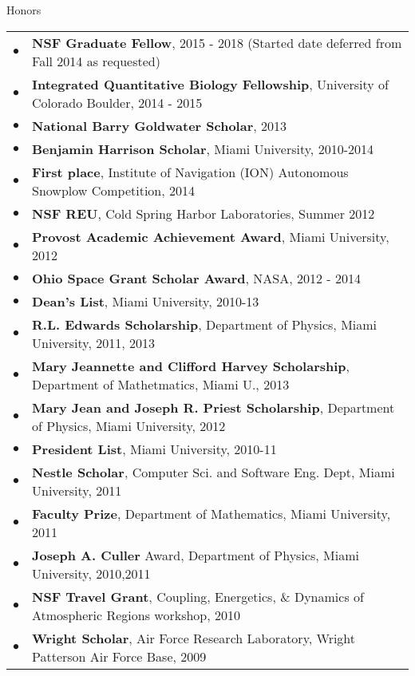 \documentclass{resume} %
\begin{document}
\begin{rSection}{Honors}
  \begin{tabular}{ll}
    $\bullet$ & \textbf{NSF Graduate Fellow}, 2015 - 2018 (Started date deferred from Fall 2014 as requested)\\
    $\bullet$ & \textbf{Integrated Quantitative Biology Fellowship}, University of Colorado Boulder, 2014 - 2015\\
    $\bullet$ & \textbf{National Barry Goldwater Scholar}, 2013\\
    $\bullet$ & \textbf{Benjamin Harrison Scholar}, Miami University, 2010-2014\\
    $\bullet$ & \textbf{First place}, Institute of Navigation (ION) Autonomous Snowplow Competition, 2014\\
    $\bullet$ & \textbf{NSF REU}, Cold Spring Harbor Laboratories, Summer 2012\\
    $\bullet$ & \textbf{Provost Academic Achievement Award}, Miami University, 2012\\
    $\bullet$ & \textbf{Ohio Space Grant Scholar Award}, NASA, 2012 - 2014\\
    $\bullet$ & \textbf{Dean's List}, Miami University, 2010-13\\
    $\bullet$ & \textbf{R.L. Edwards Scholarship}, Department of Physics, Miami University, 2011, 2013\\
    $\bullet$ & \textbf{Mary Jeannette and Clifford Harvey Scholarship}, Department of Mathetmatics, Miami U., 2013\\
    $\bullet$ & \textbf{Mary Jean and Joseph R. Priest Scholarship}, Department of Physics, Miami University, 2012\\
    $\bullet$ & \textbf{President List}, Miami University, 2010-11\\
    $\bullet$ & \textbf{Nestle Scholar}, Computer Sci. and Software Eng. Dept, Miami University, 2011\\
    $\bullet$ & \textbf{Faculty Prize}, Department of Mathematics, Miami University, 2011\\
    $\bullet$ & \textbf{Joseph A. Culler} Award, Department of Physics, Miami University, 2010,2011\\
    $\bullet$ & \textbf{NSF Travel Grant}, Coupling, Energetics, \& Dynamics of Atmospheric Regions workshop, 2010\\
    $\bullet$ & \textbf{Wright Scholar}, Air Force Research Laboratory, Wright Patterson Air Force Base, 2009\\
  \end{tabular}
\end{rSection}
\end{document}
